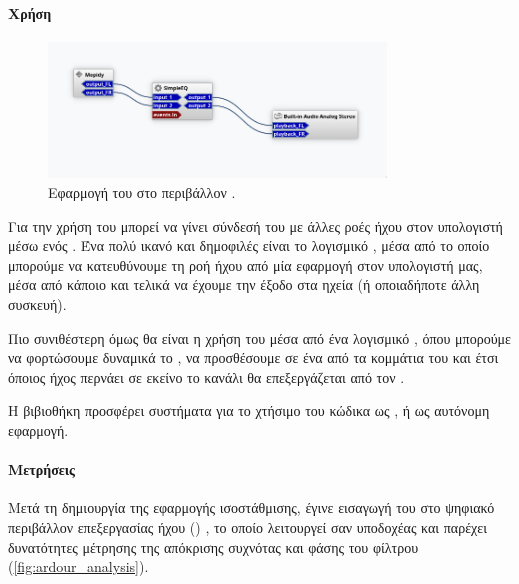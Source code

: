 \documentclass{article}
\begin{document}
\paragraph{Χρήση}

\begin{figure}[htpb]
    \centering
    \includegraphics[width=0.8\textwidth]{./assets/Carla_Basic.png}
    \caption{Εφαρμογή του  στο περιβάλλον .}
    \label{fig:carla_basic}
\end{figure}

Για την χρήση του   μπορεί να γίνει 
σύνδεσή του με άλλες ροές ήχου στον υπολογιστή μέσω ενός .
Ένα πολύ ικανό και δημοφιλές είναι το λογισμικό  \cite{CarlaApp}, 
μέσα από το οποίο μπορούμε να κατευθύνουμε τη ροή ήχου από μία εφαρμογή 
στον υπολογιστή μας, μέσα από κάποιο  και τελικά να έχουμε την έξοδο 
στα ηχεία (ή οποιαδήποτε άλλη συσκευή).

Πιο συνιθέστερη όμως θα είναι η χρήση του  μέσα από ένα λογισμικό 
, όπου μπορούμε να φορτώσουμε δυναμικά 
το , να προσθέσουμε σε ένα από τα κομμάτια του  
και έτσι όποιος ήχος περνάει σε εκείνο το κανάλι θα επεξεργάζεται από τον . 

Η βιβιοθήκη  προσφέρει συστήματα για το χτήσιμο του κώδικα 
ως  \cite{VSTWiki}, ή ως αυτόνομη εφαρμογή.  

\paragraph{Μετρήσεις}

Μετά τη δημιουργία της εφαρμογής ισοστάθμισης, έγινε εισαγωγή του  
 στο ψηφιακό περιβάλλον επεξεργασίας ήχου () , 
το οποίο λειτουργεί σαν υποδοχέας και παρέχει δυνατότητες μέτρησης της απόκρισης συχνότας και 
φάσης του φίλτρου (\cref{fig:ardour_analysis}).
\end{document}
